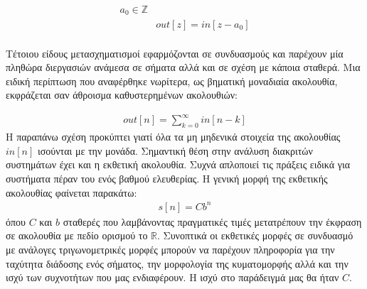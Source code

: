 \documentclass[breaklines=true, 12pt]{article}
\begin{document}
\begin{equation}
\begin{align}
a_{0} \in \mathbb{Z} \\
&out[z] = in[z-a_{0}] \\
\end{align}
\end{equation}

Τέτοιου είδους μετασχηματισμοί εφαρμόζονται σε συνδυασμούς και παρέχουν μία
πληθώρα διεργασιών ανάμεσα σε σήματα αλλά και σε σχέση με κάποια σταθερά.
Μια ειδική περίπτωση που αναφέρθηκε νωρίτερα, ως βηματική μοναδιαία
ακολουθία, εκφράζεται σαν άθροισμα καθυστερημένων ακολουθιών:

\begin{equation}
\begin{align}
out[n] = \sum_{k=0}^{\infty} in[n-k]
\end{align}
\end{equation}
Η παραπάνω σχέση προκύπτει γιατί όλα τα μη μηδενικά στοιχεία της ακολουθίας
\(in[n]\) ισούνται με την μονάδα. Σημαντική θέση στην ανάλυση διακριτών συστημάτων
έχει και η εκθετική ακολουθία. Συχνά απλοποιεί τις πράξεις ειδικά για
συστήματα πέραν του ενός βαθμού ελευθερίας. Η γενική μορφή της εκθετικής
ακολουθίας φαίνεται παρακάτω:
\begin{equation}
\begin{align}
s[n] = Cb^{n}
\end{align}
\end{equation}
όπου \(C\) και \(b\) σταθερές που λαμβάνοντας πραγματικές τιμές
μετατρέπουν την έκφραση σε ακολουθία με πεδίο ορισμού το \(\mathbb{R}\).
Συνοπτικά οι εκθετικές μορφές σε συνδυασμό με ανάλογες τριγωνομετρικές
μορφές μπορούν να παρέχουν πληροφορία για την ταχύτητα διάδοσης ενός
σήματος, την μορφολογία της κυματομορφής αλλά και την ισχύ των συχνοτήτων
που μας ενδιαφέρουν. Η ισχύ στο παράδειγμά μας θα ήταν \(C\).
\end{document}
